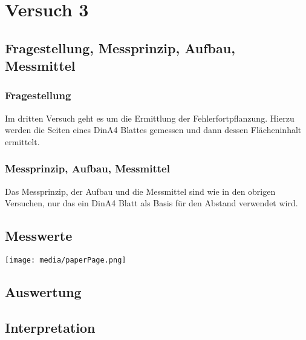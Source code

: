 \chapter{Versuch 3}
\label{chap:VERSUCH_3}

\section{Fragestellung, Messprinzip, Aufbau, Messmittel}
\label{chap:VERSUCH_3_FRAGESTELLUNG}

\subsection{Fragestellung}
Im dritten Versuch geht es um die Ermittlung der Fehlerfortpflanzung. Hierzu werden die Seiten eines DinA4 Blattes gemessen und dann dessen Flächeninhalt ermittelt.

\subsection{Messprinzip, Aufbau, Messmittel}
\label{subSec:MAM}
Das Messprinzip, der Aufbau und die Messmittel sind wie in den obrigen Versuchen, nur das ein DinA4 Blatt als Basis für den Abstand verwendet wird.

\section{Messwerte}
\label{chap:VERSUCH_3_MESSWERTE}

\texttt{[image: media/paperPage.png]}

\section{Auswertung}
\label{chap:VERSUCH_3_AUSWERTUNG}

\section{Interpretation}
\label{chap:VERSUCH_3_INTERPRETATION}
